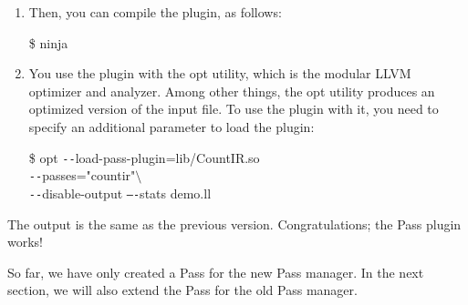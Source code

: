 \begin{enumerate}
\item Then, you can compile the plugin, as follows:
\begin{tcolorbox}[colback=white,colframe=black]
\$ ninja
\end{tcolorbox}

\item You use the plugin with the opt utility, which is the modular LLVM optimizer and analyzer. Among other things, the opt utility produces an optimized version of the input file. To use the plugin with it, you need to specify an additional parameter to load the plugin:
\begin{tcolorbox}[colback=white,colframe=black]
\$ opt \verb|--|load-pass-plugin=lib/CountIR.so \\
\verb|--|passes="countir"$\setminus$ \\
\hspace*{0.5cm}\verb|--|disable-output \verb|–-|stats demo.ll
\end{tcolorbox}

\end{enumerate}

The output is the same as the previous version. Congratulations; the Pass plugin works!\par

So far, we have only created a Pass for the new Pass manager. In the next section, we will also extend the Pass for the old Pass manager.\par




















